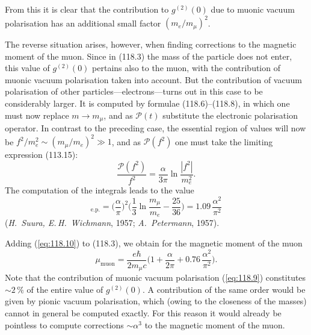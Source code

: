 From this it is clear that the contribution to $g^{(2)}(0)$ due to muonic vacuum polarisation has an additional small factor $(m_e/m_\mu)^2$.


The reverse situation arises, however, when finding corrections to the magnetic moment of the muon. Since in (118.3) the mass of the particle does not enter, this value of $g^{(2)}(0)$ pertains also to the muon, with the contribution of muonic vacuum polarisation taken into account. But the contribution of vacuum polarisation of other particles---electrons---turns out in this case to be considerably larger. It is computed by formulae (118.6)--(118.8), in which one must now replace $m \to m_\mu$, and as $\mathcal{P}(t)$ substitute the electronic polarisation operator. In contrast to the preceding case, the essential region of values will now be $f^2/m_e^2 \sim (m_\mu/m_e)^2 \gg 1$, and as $\mathcal{P}(f^2)$ one must take the limiting expression (113.15):
\[
\frac{\mathcal{P}(f^2)}{f^2} = \frac{\alpha}{3\pi}\ln\frac{|f^2|}{m_e^2}.
\]
The computation of the integrals leads to the value
\begin{equation}
[g^{(2)}(0)]_{\text{e.p.}} = \biggl(\frac{\alpha}{\pi}\biggr)^{\!2}\biggl(\frac{1}{3}\ln\frac{m_\mu}{m_e} - \frac{25}{36}\biggr) = 1.09\,\frac{\alpha^2}{\pi^2}
\label{eq:118.10}
\end{equation}
(\emph{H.~Suura, E.\,H.~Wichmann}, 1957; \emph{A.~Petermann}, 1957).

Adding (\ref{eq:118.10}) to (118.3), we obtain for the magnetic moment of the muon
\begin{equation}
\mu_{\text{muon}} = \frac{e\hbar}{2m_\mu c}\biggl(1 + \frac{\alpha}{2\pi} + 0.76\,\frac{\alpha^2}{\pi^2}\biggr).
\label{eq:118.11}
\end{equation}
Note that the contribution of muonic vacuum polarisation (\ref{eq:118.9}) constitutes $\sim 2\,\%$ of the entire value of $g^{(2)}(0)$. A contribution of the same order would be given by pionic vacuum polarisation, which (owing to the closeness of the masses) cannot in general be computed exactly. For this reason it would already be pointless to compute corrections $\sim\alpha^3$ to the magnetic moment of the muon.
